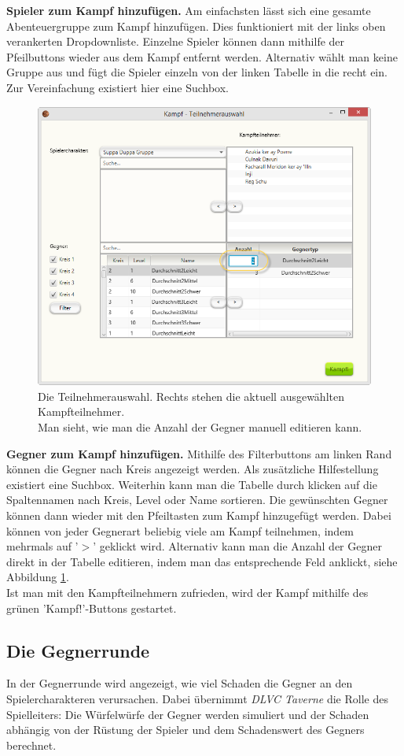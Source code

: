 \documentclass[11pt, a4paper, german]{article}
\begin{document}
\textbf{Spieler zum Kampf hinzufügen.} Am einfachsten lässt sich eine gesamte Abenteuergruppe zum Kampf hinzufügen. Dies funktioniert mit der links oben verankerten Dropdownliste. Einzelne Spieler können dann mithilfe der Pfeilbuttons wieder aus dem Kampf entfernt werden. Alternativ wählt man keine Gruppe aus und fügt die Spieler einzeln von der linken Tabelle in die recht ein. Zur Vereinfachung existiert hier eine Suchbox.\\
\begin{figure}
\centering
\includegraphics[width=.7\linewidth]{Bilder/Teilnehmerauswahl}
\caption{Die Teilnehmerauswahl. Rechts stehen die aktuell ausgewählten Kampfteilnehmer.\\ Man sieht, wie man die Anzahl der Gegner manuell editieren kann.}
\label{Abbildung: Teilnehmerauswahl}
\end{figure}

\textbf{Gegner zum Kampf hinzufügen.} Mithilfe des Filterbuttons am linken Rand können die Gegner nach Kreis angezeigt werden. Als zusätzliche Hilfestellung existiert eine Suchbox. Weiterhin kann man die Tabelle durch klicken auf die Spaltennamen nach Kreis, Level oder Name sortieren. Die gewünschten Gegner können dann wieder mit den Pfeiltasten zum Kampf hinzugefügt werden. Dabei können von jeder Gegnerart beliebig viele am Kampf teilnehmen, indem mehrmals auf '$>$' geklickt wird. Alternativ kann man die Anzahl der Gegner direkt in der Tabelle editieren, indem man das entsprechende Feld anklickt, siehe Abbildung \ref{Abbildung: Teilnehmerauswahl}.\\

Ist man mit den Kampfteilnehmern zufrieden, wird der Kampf mithilfe des grünen 'Kampf!'-Buttons gestartet.
\subsection{Die Gegnerrunde}
In der Gegnerrunde wird angezeigt, wie viel Schaden die Gegner an den Spielercharakteren verursachen. 
Dabei übernimmt \textit{DLVC Taverne} die Rolle des Spielleiters: Die Würfelwürfe der Gegner werden simuliert und der Schaden abhängig von der Rüstung der Spieler und dem Schadenswert des Gegners berechnet.\\
\end{document}
